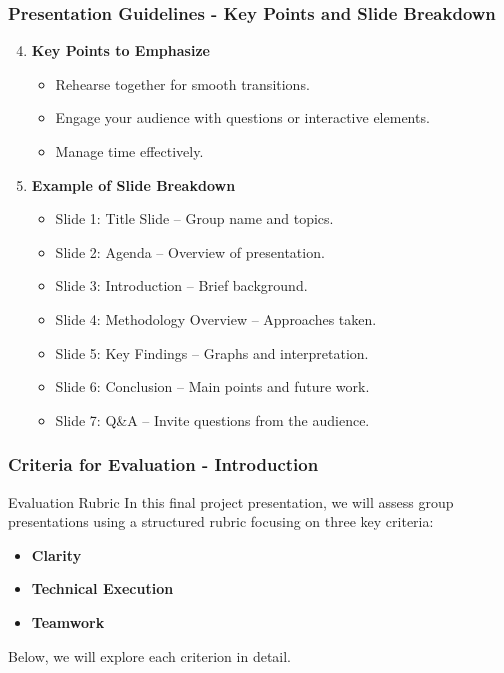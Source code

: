 \documentclass[aspectratio=169]{beamer}
\begin{document}
\begin{frame}[fragile]
    \frametitle{Presentation Guidelines - Key Points and Slide Breakdown}
    \begin{enumerate}
        \setcounter{enumi}{3}
        \item \textbf{Key Points to Emphasize}
        \begin{itemize}
            \item Rehearse together for smooth transitions.
            \item Engage your audience with questions or interactive elements.
            \item Manage time effectively.
        \end{itemize}
        
        \item  \textbf{Example of Slide Breakdown}
        \begin{itemize}
            \item Slide 1: Title Slide – Group name and topics.
            \item Slide 2: Agenda – Overview of presentation.
            \item Slide 3: Introduction – Brief background.
            \item Slide 4: Methodology Overview – Approaches taken.
            \item Slide 5: Key Findings – Graphs and interpretation.
            \item Slide 6: Conclusion – Main points and future work.
            \item Slide 7: Q\&A – Invite questions from the audience.
        \end{itemize}
    \end{enumerate}
\end{frame}

\begin{frame}[fragile]
    \frametitle{Criteria for Evaluation - Introduction}
    \begin{block}{Evaluation Rubric}
        In this final project presentation, we will assess group presentations using a structured rubric focusing on three key criteria: 
        \begin{itemize}
            \item \textbf{Clarity}
            \item \textbf{Technical Execution}
            \item \textbf{Teamwork}
        \end{itemize}
        Below, we will explore each criterion in detail.
    \end{block}
\end{frame}
\end{document}
